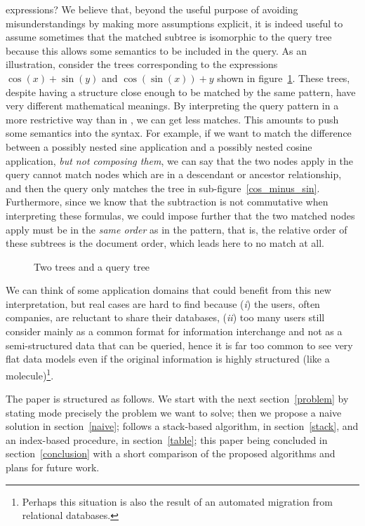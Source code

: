 \XPath expressions? We believe that, beyond the useful purpose of
avoiding misunderstandings by making more assumptions explicit, it is
indeed useful to assume sometimes that the matched subtree is
isomorphic to the query tree because this allows some semantics to be
included in the query. As an illustration, consider the \MathML trees
corresponding to the expressions \(\cos(x) + \sin(y)\) and
\(\cos(\sin(x)) + y\) shown in figure~\ref{mathml}. These trees,
despite having a structure close enough to be matched by the same
pattern, have very different mathematical meanings. By interpreting
the query pattern in a more restrictive way than in \XPath, we can get
less matches. This amounts to push some semantics into the syntax. For
example, if we want to match the difference between a possibly nested
sine application and a possibly nested cosine application, \emph{but
  not composing them}, we can say that the two nodes \textsf{apply} in
the query cannot match nodes which are in a descendant or ancestor
relationship, and then the query only matches the tree in
sub-figure~\ref{cos_minus_sin}. Furthermore, since we know that the
subtraction is not commutative when interpreting these formulas, we
could impose further that the two matched nodes \textsf{apply} must be
in the \emph{same order} as in the pattern, that is, the relative
order of these subtrees is the document order, which leads here to no
match at all.
\begin{figure}[b]
\centering
{}
\qquad\qquad
{}
\qquad
{}
\caption{Two \MathML trees and a query tree}
\label{mathml}
\end{figure}
\noindent We can think of some application domains that could benefit
from this new interpretation, but real cases are hard to find because
(\emph{i}) the users, often companies, are reluctant to share their
databases, (\emph{ii}) too many \XML users still consider \XML mainly
as a common format for information interchange and not as a
semi-structured data that can be queried, hence it is far too common
to see very flat \XML data models even if the original information is
highly structured (like a molecule)\footnote{Perhaps this situation is
  also the result of an automated migration from relational
  databases.}.

The paper is structured as follows. We start with the next
section~\ref{problem} by stating mode precisely the problem we want to
solve; then we propose a naive solution in section~\ref{naive};
follows a stack\hyp{}based algorithm, in section~\ref{stack}, and an
index\hyp{}based procedure, in section~\ref{table}; this paper being
concluded in section~\ref{conclusion} with a short comparison of the
proposed algorithms and plans for future work.
